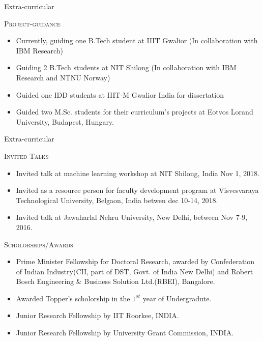 \documentclass[blue]{beamer}
\begin{document}
\begin{frame}{Extra-curricular}

\begin{tcolorbox}
\textsc{Project-guidance}
\end{tcolorbox}

\begin{itemize}
\item Currently, guiding one B.Tech student  at IIIT Gwalior (In collaboration with IBM Research)
\item Guiding 2 B.Tech students at NIT Shilong  (In collaboration with  IBM Research and NTNU Norway)
\item  Guided one  IDD students at IIIT-M Gwalior India for  dissertation 
\item Guided two M.Sc. students for their curriculum's projects at Eotvos Lorand University, Budapest, Hungary. 

\end{itemize}
\end{frame}

\begin{frame}{Extra-curricular}

\begin{tcolorbox}
\textsc{Invited Talks}
\end{tcolorbox}
\begin{itemize}
\item Invited talk at machine learning workshop at NIT Shilong, India Nov 1, 2018.
\item Invited as a resource person  for faculty development program at Visvesvaraya Technological University, Belgaon, India betwen dec 10-14, 2018.
\item Invited talk at Jawaharlal Nehru University, New Delhi, between Nov 7-9, 2016.
\end{itemize}

\end{frame}

\begin{frame}
\begin{tcolorbox}
\textsc{Scholorships/Awards}
\end{tcolorbox}

\begin{itemize}
\item Prime Minister Fellowship for Doctoral Research, awarded by Confederation of Indian Industry(CII, part of DST, Govt. of India New Delhi) and Robert Bosch Engineering \& Business Solution Ltd.(RBEI), Bangalore.
\item Awarded Topper's scholorship in the $1^{st}$  year of Undergradute.
\item Junior Research Fellowship by IIT Roorkee, INDIA.
\item Junior Research Fellowship by University Grant Commission, INDIA.
\end{itemize}

\end{frame}
\end{document}
